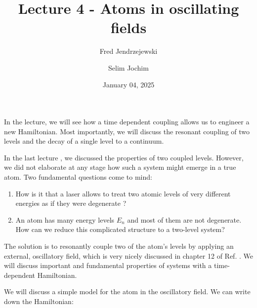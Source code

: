 \documentclass[10pt]{article}
\let\cite\citep
\renewenvironment{abstract}
  {{\bfseries\noindent{\abstractname}\par\nobreak}\footnotesize}
  {\bigskip}
\providecommand\citep{\cite}
\begin{document}
\title{Lecture 4 - Atoms in oscillating fields}



\author[1]{Fred Jendrzejewski}%
\author[2]{Selim Jochim}%
%
%


\vspace{-1em}



  
  \date{January 04, 2025}


\begingroup
\let\center\flushleft
\let\endcenter\endflushleft
\maketitle
\endgroup





\begin{abstract}
In the lecture, we will see how a time dependent coupling allows us to engineer a new Hamiltonian. Most importantly,  we will discuss the resonant coupling of two levels and the decay of a single level to a continuum.%
\end{abstract}%



\sloppy


In the last lecture \cite{Jendrzejewski}, we discussed the properties of two coupled levels. However, we did not elaborate at any stage how such a system might emerge in a true atom. Two fundamental questions come to mind:
\begin{enumerate}
\item How is it that a laser allows to treat two atomic levels of very different energies as if they were degenerate ?
\item An atom has many energy levels $E_n$ and most of them are not degenerate. How can we reduce this complicated structure to a two-level system?
\end{enumerate}

The solution is to resonantly couple two of the atom's levels by applying an external, oscillatory field, which is very nicely discussed in chapter 12 of Ref. \cite{2002} \cite{Cohen_Tannoudji_1998}. We will discuss important and fundamental properties of systems with a time-dependent Hamiltonian.

We will discuss a simple model for  the atom in the oscillatory field. We can write down the Hamiltonian:
\end{document}
